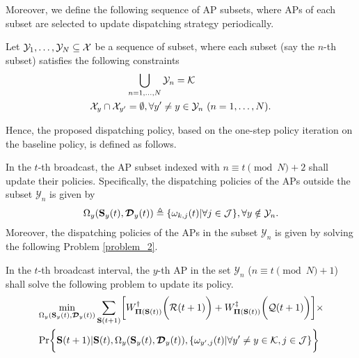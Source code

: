Moreover, we define the following sequence of AP subsets, where APs of each subset are selected to update dispatching strategy periodically.
\begin{definition}
    Let $\mathcal{Y}_{1}, \dots, \mathcal{Y}_{N} \subseteq \mathcal{X}$ be a sequence of subset, where each subset (say the $n$-th subset) satisfies the following constraints
    \begin{align}
        &\bigcup_{n=1,\dots,N} \mathcal{Y}_{n} = \mathcal{K}
        \\
        \mathcal{X}_{y} \cap \mathcal{X}_{y'} &=\emptyset, \forall y' \neq y \in \mathcal{Y}_{n}~(n=1,\dots,N).
    \end{align}
\end{definition}

Hence, the proposed dispatching policy, based on the one-step policy iteration on the baseline policy, is defined as follows.
\begin{definition}
    In the $t$-th broadcast, the AP subset indexed with $n \equiv t \pmod{N} + 2$ shall update their policies.
    Specifically, the dispatching policies of the APs outside the subset $\mathcal{Y}_{n}$ is given by
    \begin{align}
        \Omega_{y}( \mathbf{S}_{y}(t),\boldsymbol{\mathcal{D}}_{y}(t) ) \triangleq \{ \omega_{k,j}(t) | \forall j\in\mathcal{J} \}, \forall y\notin\mathcal{Y}_{n}.
    \end{align}
    Moreover, the dispatching policies of the APs in the subset $\mathcal{Y}_{n}$ is given by solving the following Problem \ref{problem_2}.
\end{definition}

\begin{problem}
    In the $t$-th broadcast interval, the $y$-th AP in the set $\mathcal{Y}_{n}$ ($n \equiv t \pmod{N} + 1$) shall solve the following problem to update its policy.
    {\tiny
    \begin{align}
        &\min_{ \Omega_{y}(\Stat_{y}(t), \Delay_{y}(t)) }
        \sum_{\Stat(t+1)} \Bracket{
            W^{\dagger}_{\Baseline(\Stat(t))} \Paren{\mathcal{R}(t+1)} + W^{\ddagger}_{\Baseline(\Stat(t))}\Paren{\mathcal{Q}(t+1)}
        } \times
        \nonumber\\
        &\Pr\Brace{
            \Stat(t+1) | \Stat(t), \Omega_{y}(\Stat_{y}(t), \Delay_{y}(t)), \set{\omega_{y',j}(t)|\forall y' \neq y \in\apSet, j\in\jSpace}
        }
    \end{align}
    }
    \label{problem_2}
\end{problem}

